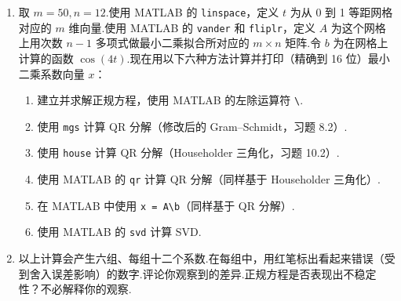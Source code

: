 \documentclass[UTF8,fontset=none,12pt]{ctexart}
\theoremstyle{definition}
\begin{document}
\begin{enumerate}[label=\textbf{11.\arabic*}]
    \item 取 $m=50,n=12$.使用 MATLAB 的 \texttt{linspace}，定义 $t$ 为从 0 到 1 等距网格对应的 $m$ 维向量.使用 MATLAB 的 \texttt{vander} 和 \texttt{fliplr}，定义 $A$ 为这个网格上用次数 $n-1$ 多项式做最小二乘拟合所对应的 $m\times n$ 矩阵.令 $b$ 为在网格上计算的函数 $\cos(4t)$.现在用以下六种方法计算并打印（精确到 16 位）最小二乘系数向量 $x$：
    \begin{enumerate}[label=(\alph*)]
        \item 建立并求解正规方程，使用 MATLAB 的左除运算符 \texttt{\textbackslash}.
        \item 使用 \texttt{mgs} 计算 QR 分解（修改后的 Gram--Schmidt，习题 8.2）.
        \item 使用 \texttt{house} 计算 QR 分解（Householder 三角化，习题 10.2）.
        \item 使用 MATLAB 的 \texttt{qr} 计算 QR 分解（同样基于 Householder 三角化）.
        \item 在 MATLAB 中使用 \texttt{x = A\textbackslash b}（同样基于 QR 分解）.
        \item 使用 MATLAB 的 \texttt{svd} 计算 SVD.
    \end{enumerate}
    \item 以上计算会产生六组、每组十二个系数.在每组中，用红笔标出看起来错误（受到舍入误差影响）的数字.评论你观察到的差异.正规方程是否表现出不稳定性？不必解释你的观察.
\end{enumerate}
\end{document}
